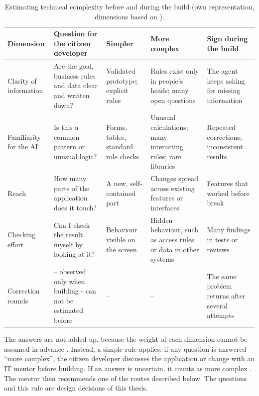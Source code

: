 \documentclass[10pt,a4paper]{article}
\begin{document}
\begin{table}[H]
    \centering
    \small
    \caption{Estimating technical complexity before and during the build
    (own representation, dimensions based on
    \textcite{alaswad2026framework}).}
    \label{tab:complexity-estimation}
    \begin{tabular}{@{}p{2.2cm} p{3.4cm} p{2.5cm} p{2.8cm} p{2.7cm}@{}}
    \toprule
    \textbf{Dimension} & \textbf{Question for the citizen developer} &
        \textbf{Simpler} & \textbf{More complex} & \textbf{Sign during
        the build} \\
    \midrule
    Clarity of information & Are the goal, business rules and data
        clear and written down? & Validated prototype; explicit rules &
        Rules exist only in people's heads; many open questions & The
        agent keeps asking for missing information \\
    \addlinespace
    Familiarity for the AI & Is this a common pattern or unusual
        logic? & Forms, tables, standard role checks & Unusual
        calculations; many interacting rules; rare libraries &
        Repeated corrections; inconsistent results \\
    \addlinespace
    Reach & How many parts of the application does it touch? & A new,
        self-contained part & Changes spread across existing features
        or interfaces & Features that worked before break \\
    \addlinespace
    Checking effort & Can I check the result myself by looking at it? &
        Behaviour visible on the screen & Hidden behaviour, such as
        access rules or data in other systems & Many findings in tests
        or reviews \\
    \addlinespace
    Correction rounds & -- observed only when building - can not be estimated before & -- & -- & The same problem
        returns after several attempts \\
    \bottomrule
    \end{tabular}
\end{table}

The answers are not added up, because the weight of each dimension
cannot be assumed in advance \parencite{alaswad2026framework}. Instead,
a simple rule applies: if any question is answered \enquote{more
complex}, the citizen developer discusses the application or change
with an IT mentor before building. If an answer is uncertain, it counts
as more complex \parencite{moreira2026}. The mentor then recommends one
of the routes described below. The questions and this rule are design
decisions of this thesis.
\end{document}
